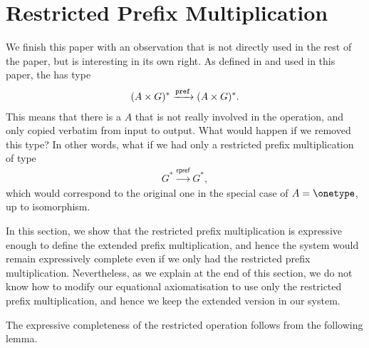 \section{Restricted Prefix Multiplication}
\label{sec:restricted-prefix-multiplication}

\newcommand{\rprefterm}{\mathsf{rpref}}
We finish this paper with an observation that is not directly used in the rest of the paper, but is interesting in its own right. 
As defined in \cite{BojanczykDaviaudKrishna2018} and used in this paper, the  has type 
\begin{align*}
(A \times G)^* \xrightarrow{\mathtt{pref}} (A  \times G)^*.
\end{align*}
This means that there is a  $A$ that is not really involved in the operation, and only copied verbatim from input to output.  What would happen if we removed this type? In other words, what if we had only a restricted prefix multiplication of type 
\begin{align*}
G^* \xrightarrow{\rprefterm} G^*,
\end{align*}
which would correspond to the original one in the special case of $A = \onetype$, up to isomorphism. 


In this section, we show that the restricted prefix multiplication is expressive enough to define the extended prefix multiplication, and hence the system would remain expressively complete even if we only had the restricted prefix multiplication. Nevertheless, as we explain at the end of this section,  we do not know how to modify our equational axiomatisation to use only the restricted prefix multiplication, and hence we keep the extended version in our system.

The expressive completeness of the restricted operation follows from the following lemma.


